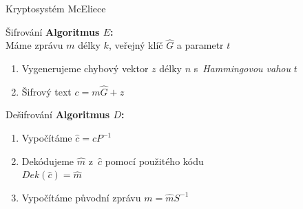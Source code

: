 \documentclass{beamer}
\begin{document}
\begin{frame}{Kryptosystém McEliece}

    \begin{block}{Šifrování}
        \textbf{Algoritmus $E$:} \\
        Máme zprávu $m$ délky $k$, veřejný klíč $\hat{G}$ a parametr $t$
        \begin{enumerate}
            \item Vygenerujeme chybový vektor $z$ délky $n$ s~\emph{Hammingovou
                vahou} $t$
            \item Šifrový text $c = m \hat{G} + z$
        \end{enumerate}
    \end{block}

    \begin{block}{Dešifrování}
        \textbf{Algoritmus $D$:}
        \begin{enumerate}
            \item Vypočítáme $\hat{c} = c P^{-1}$
            \item Dekódujeme $\hat{m}$ z~$\hat{c}$ pomocí použitého kódu \\
                $Dek(\hat{c}) = \hat{m}$
            \item Vypočítáme původní zprávu $m = \hat{m} S^{-1}$
        \end{enumerate}
    \end{block}

\end{frame}
\end{document}
